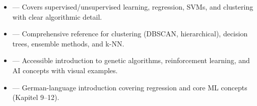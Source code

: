 \begin{tcbitemize}[ skin=sectionraster ]
    \tcbitem[title=Recommended Sources for Machine Learning, raster multicolumn=6]
    \begin{itemize}
        \item {} — Covers supervised/unsupervised learning, regression, SVMs, and clustering with clear algorithmic detail.
        \item {} — Comprehensive reference for clustering (DBSCAN, hierarchical), decision trees, ensemble methods, and k-NN.
        \item {} — Accessible introduction to genetic algorithms, reinforcement learning, and AI concepts with visual examples.
        \item {} — German-language introduction covering regression and core ML concepts (Kapitel 9--12).
    \end{itemize}
\end{tcbitemize}
